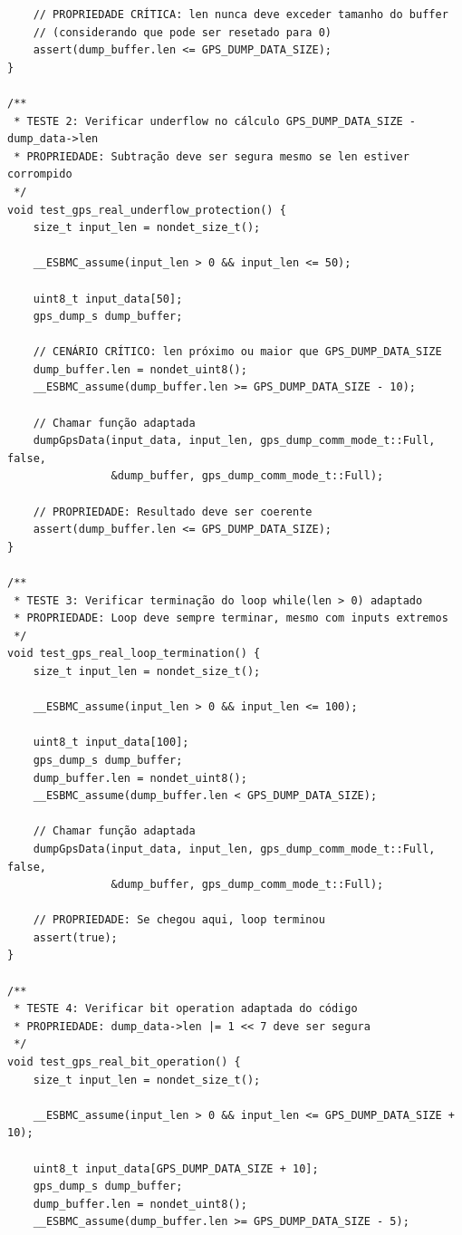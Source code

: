 \begin{lstlisting}
    // PROPRIEDADE CRÍTICA: len nunca deve exceder tamanho do buffer
    // (considerando que pode ser resetado para 0)
    assert(dump_buffer.len <= GPS_DUMP_DATA_SIZE);
}

/**
 * TESTE 2: Verificar underflow no cálculo GPS_DUMP_DATA_SIZE - dump_data->len
 * PROPRIEDADE: Subtração deve ser segura mesmo se len estiver corrompido
 */
void test_gps_real_underflow_protection() {
    size_t input_len = nondet_size_t();
    
    __ESBMC_assume(input_len > 0 && input_len <= 50);
    
    uint8_t input_data[50];
    gps_dump_s dump_buffer;
    
    // CENÁRIO CRÍTICO: len próximo ou maior que GPS_DUMP_DATA_SIZE
    dump_buffer.len = nondet_uint8();
    __ESBMC_assume(dump_buffer.len >= GPS_DUMP_DATA_SIZE - 10);
    
    // Chamar função adaptada
    dumpGpsData(input_data, input_len, gps_dump_comm_mode_t::Full, false, 
                &dump_buffer, gps_dump_comm_mode_t::Full);
    
    // PROPRIEDADE: Resultado deve ser coerente
    assert(dump_buffer.len <= GPS_DUMP_DATA_SIZE);
}

/**
 * TESTE 3: Verificar terminação do loop while(len > 0) adaptado
 * PROPRIEDADE: Loop deve sempre terminar, mesmo com inputs extremos
 */
void test_gps_real_loop_termination() {
    size_t input_len = nondet_size_t();
    
    __ESBMC_assume(input_len > 0 && input_len <= 100);
    
    uint8_t input_data[100];
    gps_dump_s dump_buffer;
    dump_buffer.len = nondet_uint8();
    __ESBMC_assume(dump_buffer.len < GPS_DUMP_DATA_SIZE);
    
    // Chamar função adaptada
    dumpGpsData(input_data, input_len, gps_dump_comm_mode_t::Full, false, 
                &dump_buffer, gps_dump_comm_mode_t::Full);
    
    // PROPRIEDADE: Se chegou aqui, loop terminou
    assert(true);
}

/**
 * TESTE 4: Verificar bit operation adaptada do código
 * PROPRIEDADE: dump_data->len |= 1 << 7 deve ser segura
 */
void test_gps_real_bit_operation() {
    size_t input_len = nondet_size_t();
    
    __ESBMC_assume(input_len > 0 && input_len <= GPS_DUMP_DATA_SIZE + 10);
    
    uint8_t input_data[GPS_DUMP_DATA_SIZE + 10];
    gps_dump_s dump_buffer;
    dump_buffer.len = nondet_uint8();
    __ESBMC_assume(dump_buffer.len >= GPS_DUMP_DATA_SIZE - 5);
    

\end{lstlisting}

